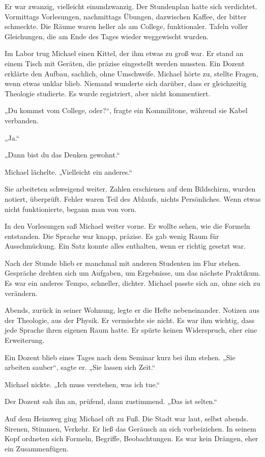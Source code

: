 \documentclass[
]{article}
\begin{document}
Er war zwanzig, vielleicht einundzwanzig. Der Stundenplan hatte sich verdichtet. Vormittags Vorlesungen, nachmittags Übungen, dazwischen Kaffee, der bitter schmeckte. Die Räume waren heller als am College, funktionaler. Tafeln voller Gleichungen, die am Ende des Tages wieder weggewischt wurden.

Im Labor trug Michael einen Kittel, der ihm etwas zu groß war. Er stand an einem Tisch mit Geräten, die präzise eingestellt werden mussten. Ein Dozent erklärte den Aufbau, sachlich, ohne Umschweife. Michael hörte zu, stellte Fragen, wenn etwas unklar blieb. Niemand wunderte sich darüber, dass er gleichzeitig Theologie studierte. Es wurde registriert, aber nicht kommentiert.

„Du kommst vom College, oder?{\kern0pt}``, fragte ein Kommilitone, während sie Kabel verbanden.

„Ja.``

„Dann bist du das Denken gewohnt.``

Michael lächelte. „Vielleicht ein anderes.``

Sie arbeiteten schweigend weiter. Zahlen erschienen auf dem Bildschirm, wurden notiert, überprüft. Fehler waren Teil des Ablaufs, nichts Persönliches. Wenn etwas nicht funktionierte, begann man von vorn.

In den Vorlesungen saß Michael weiter vorne. Er wollte sehen, wie die Formeln entstanden. Die Sprache war knapp, präzise. Es gab wenig Raum für Ausschmückung. Ein Satz konnte alles enthalten, wenn er richtig gesetzt war.

Nach der Stunde blieb er manchmal mit anderen Studenten im Flur stehen. Gespräche drehten sich um Aufgaben, um Ergebnisse, um das nächste Praktikum. Es war ein anderes Tempo, schneller, dichter. Michael passte sich an, ohne sich zu verändern.

Abends, zurück in seiner Wohnung, legte er die Hefte nebeneinander. Notizen aus der Theologie, aus der Physik. Er vermischte sie nicht. Es war ihm wichtig, dass jede Sprache ihren eigenen Raum hatte. Er spürte keinen Widerspruch, eher eine Erweiterung.

Ein Dozent blieb eines Tages nach dem Seminar kurz bei ihm stehen. „Sie arbeiten sauber``, sagte er. „Sie lassen sich Zeit.``

Michael nickte. „Ich muss verstehen, was ich tue.``

Der Dozent sah ihn an, prüfend, dann zustimmend. „Das ist selten.``

Auf dem Heimweg ging Michael oft zu Fuß. Die Stadt war laut, selbst abends. Sirenen, Stimmen, Verkehr. Er ließ das Geräusch an sich vorbeiziehen. In seinem Kopf ordneten sich Formeln, Begriffe, Beobachtungen. Es war kein Drängen, eher ein Zusammenfügen.
\end{document}
